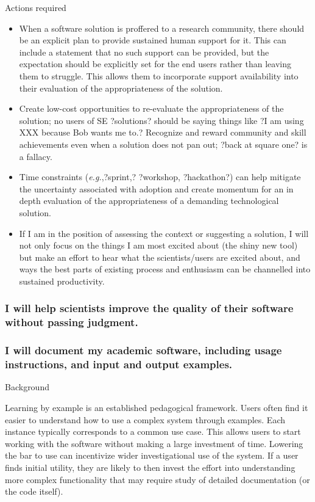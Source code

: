 \documentclass[a4paper,UKenglish]{dagman}
\renewcommand{\paragraph}[1]{\subsubsection*{#1}\xspace}
\newcommand{\eg}{\emph{e.g.},\xspace}
\begin{document}
Actions required
\begin{itemize}
\item When a software solution is proffered to a research community, there should be an explicit plan to provide sustained human support for it. This can include a statement that no such support can be provided, but the expectation should be explicitly set for the end users rather than leaving them to struggle. This allows them to incorporate support availability into their evaluation of the appropriateness of the solution. 
\item Create low-cost opportunities to re-evaluate the appropriateness of the solution; no users of SE ?solutions? should be saying things like ?I am using XXX because Bob wants me to.? Recognize and reward community and skill achievements even when a solution does not pan out; ?back at square one? is a fallacy.
\item Time constraints (\eg ?sprint,? ?workshop, ?hackathon?) can help mitigate the uncertainty associated with adoption and create momentum for an in depth evaluation of the appropriateness of a demanding technological solution.
\item If I am in the position of assessing the context or suggesting a solution, I will not only focus on the things I am most excited about (the shiny new tool) but make an effort to hear what the scientists/users are excited about, and ways the best parts of existing process and enthusiasm can be channelled into sustained productivity.

\end{itemize}

\paragraph{I will help scientists improve the quality of their software without passing judgment.}


\paragraph{I will document my academic software, including usage instructions, and input and output examples.}


Background

Learning by example is an established pedagogical framework. Users often find it easier to understand how to use a complex system through examples. Each instance typically corresponds to a common use case. This allows users to start working with the software without making a large investment of time. Lowering the bar to use can incentivize wider investigational use of the system. If a user finds initial utility, they are likely to then invest the effort into understanding more complex functionality that may require study of detailed documentation (or the code itself).
\end{document}
